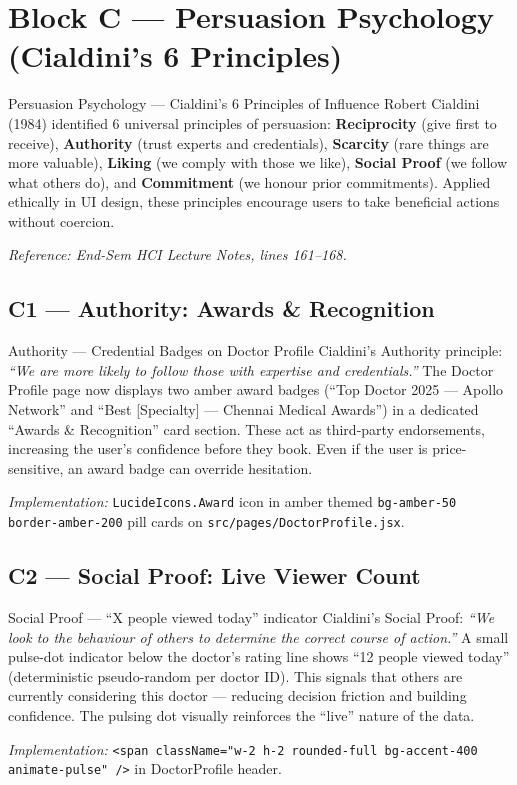 \documentclass[12pt, a4paper]{article}
\begin{document}
\section{Block C --- Persuasion Psychology (Cialdini's 6 Principles)}

\begin{hcibox}{Persuasion Psychology --- Cialdini's 6 Principles of Influence}
Robert Cialdini (1984) identified 6 universal principles of persuasion: \textbf{Reciprocity} (give first to receive), \textbf{Authority} (trust experts and credentials), \textbf{Scarcity} (rare things are more valuable), \textbf{Liking} (we comply with those we like), \textbf{Social Proof} (we follow what others do), and \textbf{Commitment} (we honour prior commitments). Applied ethically in UI design, these principles encourage users to take beneficial actions without coercion.

\textit{Reference: End-Sem HCI Lecture Notes, lines 161--168.}
\end{hcibox}

\subsection{C1 --- Authority: Awards \& Recognition}

\begin{featurebox}{Authority --- Credential Badges on Doctor Profile}
Cialdini's Authority principle: \textit{``We are more likely to follow those with expertise and credentials.''} The Doctor Profile page now displays two amber award badges (``Top Doctor 2025 --- Apollo Network'' and ``Best [Specialty] --- Chennai Medical Awards'') in a dedicated ``Awards \& Recognition'' card section. These act as third-party endorsements, increasing the user's confidence before they book. Even if the user is price-sensitive, an award badge can override hesitation.

\textit{Implementation:} \texttt{LucideIcons.Award} icon in amber themed \texttt{bg-amber-50 border-amber-200} pill cards on \texttt{src/pages/DoctorProfile.jsx}.
\end{featurebox}

\subsection{C2 --- Social Proof: Live Viewer Count}

\begin{featurebox}{Social Proof --- ``X people viewed today'' indicator}
Cialdini's Social Proof: \textit{``We look to the behaviour of others to determine the correct course of action.''} A small pulse-dot indicator below the doctor's rating line shows ``12 people viewed today'' (deterministic pseudo-random per doctor ID). This signals that others are currently considering this doctor --- reducing decision friction and building confidence. The pulsing dot visually reinforces the ``live'' nature of the data.

\textit{Implementation:} \texttt{<span className="w-2 h-2 rounded-full bg-accent-400 animate-pulse" />} in DoctorProfile header.
\end{featurebox}
\end{document}
